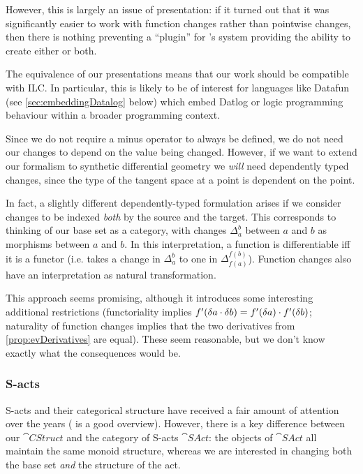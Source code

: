 However, this is largely an issue of presentation: if it turned out that it was
significantly easier to work with function changes rather than pointwise
changes, then there is nothing preventing a ``plugin'' for \citeauthor{cai2014changes}'s system providing the
ability to create either or both.

The equivalence of our presentations means that our work should be compatible
with ILC. In particular, this is likely to be of interest for languages like
Datafun (see \cref{sec:embeddingDatalog} below) which embed Datlog or logic programming behaviour within a broader
programming context.

Since we do not require a minus operator to always be defined, we do not need
our changes to depend on the value being changed. However,
if we want to extend our formalism to synthetic differential geometry we \emph{will} need
dependently typed changes, since the type of the tangent space at a point is
dependent on the point.

In fact, a slightly different dependently-typed formulation arises if we consider changes
to be indexed \emph{both} by the source and the target. This corresponds to 
thinking of our base set as a category, with changes $\Delta_a^b$ between $a$
and $b$ as morphisms between $a$ and $b$. In this interpretation, a function is
differentiable iff it is a functor (i.e. takes a change in $\Delta_a^b$ to one in
$\Delta_{f(a)}^{f(b)}$). Function changes also have an interpretation as natural
transformation.

This approach seems promising, although it introduces some
interesting additional restrictions (functoriality implies $f'(\delta a \cdot \delta b) =
f'(\delta a) \cdot f'(\delta b)$; naturality of function
changes implies that
the two derivatives from \cref{prop:evDerivatives} are equal). These seem
reasonable, but we don't know exactly what the consequences would be.

\subsubsection{S-acts}

S-acts and their categorical structure have received a fair amount of attention
over the years (\textcite{kilp2000monoids} is a good
overview). However, there is a key difference between our $\cat{CStruct}$ and the category of
S-acts $\cat{SAct}$: the objects of $\cat{SAct}$ all maintain the same monoid
structure, whereas we are interested in changing both the base set \emph{and} the structure of the act.

